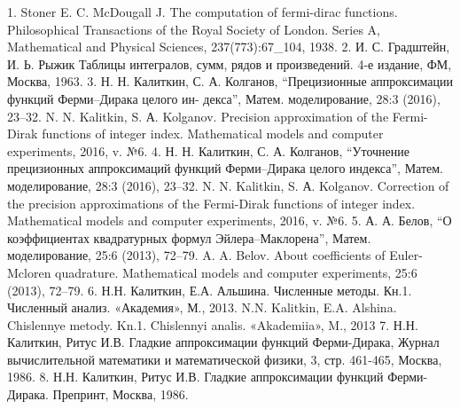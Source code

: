 
1. Stoner E. C. McDougall J. The computation of fermi-dirac functions. Philosophical Transactions of the Royal
Society of London. Series A, Mathematical and Physical Sciences, 237(773):67_104, 1938.
2. И. С. Градштейн, И. Ь. Рыжик Таблицы интегралов, сумм, рядов и произведений. 4-е издание, ФМ,
Москва, 1963.
3. Н. Н. Калиткин, С. А. Колганов, “Прецизионные аппроксимации функций Ферми–Дирака целого ин-
декса”, Матем. моделирование, 28:3 (2016), 23–32.
N. N. Kalitkin, S. А. Kolganov. Precision approximation of the Fermi-Dirak functions of integer index. Mathematical
models and computer experiments, 2016, v. №6.
4. Н. Н. Калиткин, С. А. Колганов, “Уточнение прецизионных аппроксимаций функций Ферми–Дирака
целого индекса”, Матем. моделирование, 28:3 (2016), 23–32.
N. N. Kalitkin, S. А. Kolganov. Correction of the precision approximations of the Fermi-Dirak functions of
integer index. Mathematical models and computer experiments, 2016, v. №6.
5. А. А. Белов, “О коэффициентах квадратурных формул Эйлера–Маклорена”, Матем. моделирование, 25:6
(2013), 72–79.
A. A. Belov. About coefficients of Euler-Mcloren quadrature. Mathematical models and computer experiments,
25:6 (2013), 72–79.
6. Н.Н. Калиткин, Е.А. Альшина. Численные методы. Кн.1. Численный анализ. «Академия», М., 2013.
N.N. Kalitkin, E.A. Alshina. Chislennye metody. Kn.1. Chislennyi analis. «Akademiia», M., 2013
7. Н.Н. Калиткин, Ритус И.В. Гладкие аппроксимации функций Ферми-Дирака, Журнал вычислительной
математики и математической физики, 3, стр. 461-465, Москва, 1986.
8. Н.Н. Калиткин, Ритус И.В. Гладкие аппроксимации функций Ферми-Дирака. Препринт, Москва, 1986.